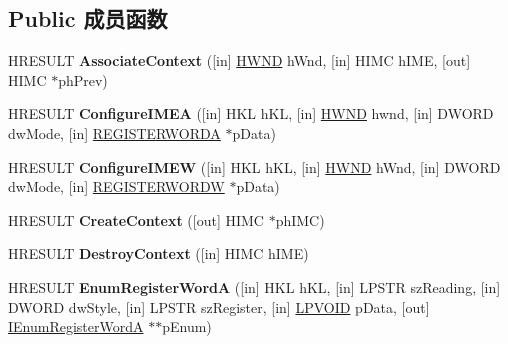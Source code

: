 \subsection*{Public 成员函数}
\begin{DoxyCompactItemize}
\item 
\mbox{\label{interface_i_active_i_m_m_app_a1f6e22ad5ef09b792036c5e978b178b5}} 
H\+R\+E\+S\+U\+LT {\bfseries Associate\+Context} (\mbox{[}in\mbox{]} \hyperlink{interfacevoid}{H\+W\+ND} h\+Wnd, \mbox{[}in\mbox{]} H\+I\+MC h\+I\+ME, \mbox{[}out\mbox{]} H\+I\+MC $\ast$ph\+Prev)
\item 
\mbox{\label{interface_i_active_i_m_m_app_a809e5345f7ad53f7d983811b53202714}} 
H\+R\+E\+S\+U\+LT {\bfseries Configure\+I\+M\+EA} (\mbox{[}in\mbox{]} H\+KL h\+KL, \mbox{[}in\mbox{]} \hyperlink{interfacevoid}{H\+W\+ND} hwnd, \mbox{[}in\mbox{]} D\+W\+O\+RD dw\+Mode, \mbox{[}in\mbox{]} \hyperlink{struct_r_e_g_i_s_t_e_r_w_o_r_d_a}{R\+E\+G\+I\+S\+T\+E\+R\+W\+O\+R\+DA} $\ast$p\+Data)
\item 
\mbox{\label{interface_i_active_i_m_m_app_a50288f26a7bc5f6272773c3efe5e6638}} 
H\+R\+E\+S\+U\+LT {\bfseries Configure\+I\+M\+EW} (\mbox{[}in\mbox{]} H\+KL h\+KL, \mbox{[}in\mbox{]} \hyperlink{interfacevoid}{H\+W\+ND} h\+Wnd, \mbox{[}in\mbox{]} D\+W\+O\+RD dw\+Mode, \mbox{[}in\mbox{]} \hyperlink{struct_r_e_g_i_s_t_e_r_w_o_r_d_w}{R\+E\+G\+I\+S\+T\+E\+R\+W\+O\+R\+DW} $\ast$p\+Data)
\item 
\mbox{\label{interface_i_active_i_m_m_app_ab8269f7ff12faecdfd83144c5ec4e57e}} 
H\+R\+E\+S\+U\+LT {\bfseries Create\+Context} (\mbox{[}out\mbox{]} H\+I\+MC $\ast$ph\+I\+MC)
\item 
\mbox{\label{interface_i_active_i_m_m_app_af54aac52d83e8945e510f161ad789bdf}} 
H\+R\+E\+S\+U\+LT {\bfseries Destroy\+Context} (\mbox{[}in\mbox{]} H\+I\+MC h\+I\+ME)
\item 
\mbox{\label{interface_i_active_i_m_m_app_a59d7ac9776758e131bd042bd78803853}} 
H\+R\+E\+S\+U\+LT {\bfseries Enum\+Register\+WordA} (\mbox{[}in\mbox{]} H\+KL h\+KL, \mbox{[}in\mbox{]} L\+P\+S\+TR sz\+Reading, \mbox{[}in\mbox{]} D\+W\+O\+RD dw\+Style, \mbox{[}in\mbox{]} L\+P\+S\+TR sz\+Register, \mbox{[}in\mbox{]} \hyperlink{interfacevoid}{L\+P\+V\+O\+ID} p\+Data, \mbox{[}out\mbox{]} \hyperlink{interface_i_enum_register_word_a}{I\+Enum\+Register\+WordA} $\ast$$\ast$p\+Enum)
$$
\end{DoxyCompactItemize}
